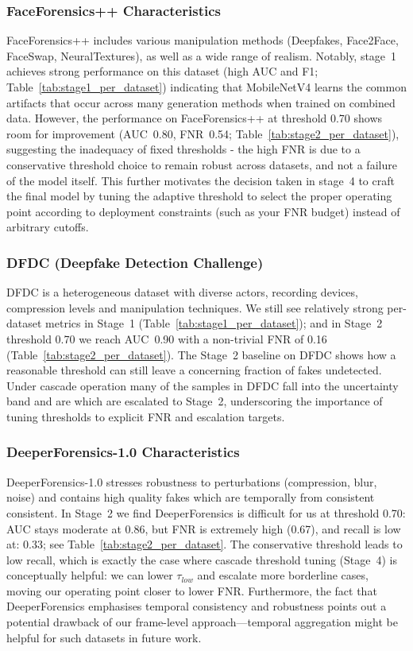 \subsubsection{FaceForensics++ Characteristics}
FaceForensics++ includes various manipulation methods (Deepfakes, Face2Face, FaceSwap, NeuralTextures), as well as a wide range of realism. Notably, stage~1 achieves strong performance on this dataset (high AUC and F1; Table~\ref{tab:stage1_per_dataset}) indicating that MobileNetV4 learns the common artifacts that occur across many generation methods when trained on combined data. However, the performance on FaceForensics++ at threshold 0.70 shows room for improvement (AUC~\num{0.80}, FNR~\num{0.54}; Table~\ref{tab:stage2_per_dataset}), suggesting the inadequacy of fixed thresholds \hyp{} the high FNR is due to a conservative threshold choice to remain robust across datasets, and not a failure of the model itself. This further motivates the decision taken in stage~4 to craft the final model by tuning the adaptive threshold to select the proper operating point according to deployment constraints (such as your FNR budget) instead of arbitrary cutoffs.

\subsubsection{DFDC (Deepfake Detection Challenge)}
DFDC is a heterogeneous dataset with diverse actors, recording devices, compression levels and manipulation techniques. We still see relatively strong per\hyp dataset metrics in Stage~1 (Table~\ref{tab:stage1_per_dataset}); and in Stage~2 threshold 0.70 we reach AUC~\num{0.90} with a non\hyp trivial FNR of \num{0.16} (Table~\ref{tab:stage2_per_dataset}). The Stage~2 baseline on DFDC shows how a reasonable threshold can still leave a concerning fraction of fakes undetected. Under cascade operation many of the samples in DFDC fall into the uncertainty band and are which are escalated to Stage~2, underscoring the importance of tuning thresholds to explicit FNR and escalation targets.

\subsubsection{DeeperForensics-1.0 Characteristics}
DeeperForensics\hyp 1.0 stresses robustness to perturbations (compression, blur, noise) and contains high quality fakes which are temporally from consistent consistent. In Stage~2 we find DeeperForensics is difficult for us at threshold 0.70: AUC stays moderate at \num{0.86}, but FNR is extremely high (\num{0.67}), and recall is low at: \num{0.33}; see Table~\ref{tab:stage2_per_dataset}. The conservative threshold leads to low recall, which is exactly the case where cascade threshold tuning (Stage~4) is conceptually helpful: we can lower $\tau_{low}$ and escalate more borderline cases, moving our operating point closer to lower FNR. Furthermore, the fact that DeeperForensics emphasises temporal consistency and robustness points out a potential drawback of our frame\hyp level approach---temporal aggregation might be helpful for such datasets in future work.

